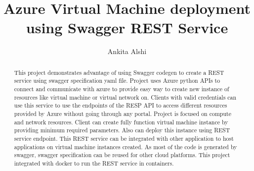 
\title{Azure Virtual Machine deployment using Swagger REST Service}


\def\paperstatus{0} %
\def\paperchapter{REST} %
\def\hid{hid-sp18-502} %
\def\volume{9} %

\def\locator{\hid, Volume: \volume, Chapter: \paperchapter, Status: \paperstatus. \newline}

\author{Ankita Alshi}


\renewcommand{\shortauthors}{Ankita Alshi}

\begin{abstract}
This project demonstrates advantage of using Swagger codegen to create a REST
service using swagger specification yaml file. Project uses Azure python APIs
to connect and communicate with azure to provide easy way to create new
instance of resources like virtual machine or virtual network on. Clients with
valid credentials can use this service to use the endpoints of the RESP API to
access different resources provided by Azure without going through any portal.
Project is focused on compute and network resources. Client can create fully
function virtual machine instance by providing minimum required parameters.
Also can deploy this instance using REST service endpoint. This REST service
can be integrated with other application to host applications on virtual
machine instances created. As most of the code is generated by swagger,
swagger specification can be reused for other cloud platforms. This project
integrated with docker to run the REST service in containers.

\end{abstract}

